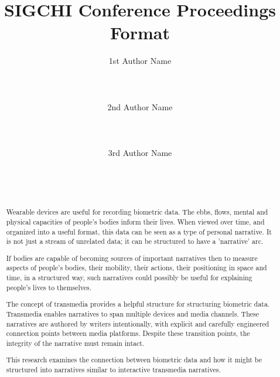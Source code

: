 \documentclass{SIGCHI2015LaTex/sigchi}
\begin{document}
\title{SIGCHI Conference Proceedings Format}

\author{
  \alignauthor 1st Author Name\\
    \\
    \\
    \\
  \alignauthor 2nd Author Name\\
    \\
    \\
    \\
  \alignauthor 3rd Author Name\\
    \\
    \\
    \\
}

\maketitle

\begin{abstract}

Wearable devices are useful for recording biometric data. The ebbs, flows, mental and physical capacities of people's bodies inform their lives. When viewed over time, and organized into a useful format, this data can be seen as a type of personal narrative. It is not just a stream of unrelated data; it can be structured to have a 'narrative' arc. 

If bodies are capable of becoming sources of important narratives then to measure aspects of people's bodies, their mobility, their actions, their positioning in space and time, in a structured way, such narratives could possibly be useful for explaining people's lives to themselves.

The concept of transmedia provides a helpful structure for structuring biometric data. Transmedia enables narratives to span multiple devices and media channels. These narratives are authored by writers intentionally, with explicit and carefully engineered connection points between media platforms. Despite these transition points, the integrity of the narrative must remain intact. 

This research examines the connection between biometric data and how it might be structured into narratives similar to interactive transmedia narratives. 
\end{abstract}
\end{document}
